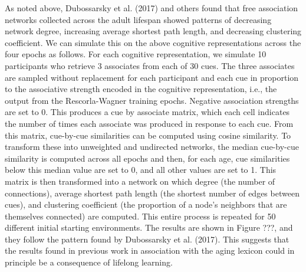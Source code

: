 \documentclass[
  man]{apa6}
\begin{document}
As noted above, Dubossarsky et al. (2017) and others found that free association networks collected across the adult lifespan showed patterns of decreasing network degree, increasing average shortest path length, and decreasing clustering coefficient. We can simulate this on the above cognitive representations across the four epochs as follows. For each cognitive representation, we simulate 10 participants who retrieve 3 associates from each of 30 cues. The three associates are sampled without replacement for each participant and each cue in proportion to the associative strength encoded in the cognitive representation, i.e., the output from the Rescorla-Wagner training epochs. Negative association strengths are set to 0. This produces a cue by associate matrix, which each cell indicates the number of times each associate was produced in response to each cue. From this matrix, cue-by-cue similarities can be computed using cosine similarity. To transform these into unweighted and undirected networks, the median cue-by-cue similarity is computed across all epochs and then, for each age, cue similarities below this median value are set to 0, and all other values are set to 1. This matrix is then transformed into a network on which degree (the number of connections), average shortest path length (the shortest number of edges between cues), and clustering coefficient (the proportion of a node's neighbors that are themselves connected) are computed. This entire process is repeated for 50 different initial starting environments. The results are shown in Figure ???, and they follow the pattern found by Dubossarsky et al. (2017). This suggests that the results found in previous work in association with the aging lexicon could in principle be a consequence of lifelong learning.
\end{document}
